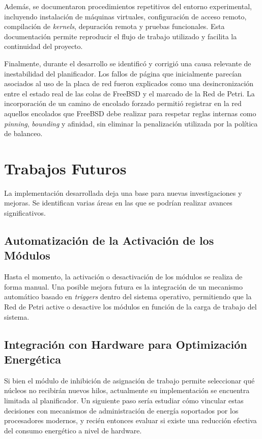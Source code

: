 Además, se documentaron procedimientos repetitivos del entorno experimental, incluyendo instalación de máquinas virtuales, configuración de acceso remoto, compilación de \textit{kernels}, depuración remota y pruebas funcionales. Esta documentación permite reproducir el flujo de trabajo utilizado y facilita la continuidad del proyecto.\par

Finalmente, durante el desarrollo se identificó y corrigió una causa relevante de inestabilidad del planificador. Los fallos de página que inicialmente parecían asociados al uso de la placa de red fueron explicados como una desincronización entre el estado real de las colas de FreeBSD y el marcado de la Red de Petri. La incorporación de un camino de encolado forzado permitió registrar en la red aquellos encolados que FreeBSD debe realizar para respetar reglas internas como \textit{pinning}, \textit{bounding} y afinidad, sin eliminar la penalización utilizada por la política de balanceo.\par

\section{Trabajos Futuros}

La implementación desarrollada deja una base para nuevas investigaciones y mejoras. Se identifican varias áreas en las que se podrían realizar avances significativos.\par

\subsection{Automatización de la Activación de los Módulos}
Hasta el momento, la activación o desactivación de los módulos se realiza de forma manual. Una posible mejora futura es la integración de un mecanismo automático basado en \textit{triggers} dentro del sistema operativo, permitiendo que la Red de Petri active o desactive los módulos en función de la carga de trabajo del sistema.\par

\subsection{Integración con Hardware para Optimización Energética}
Si bien el módulo de inhibición de asignación de trabajo permite seleccionar qué núcleos no recibirán nuevos hilos, actualmente su implementación se encuentra limitada al planificador. Un siguiente paso sería estudiar cómo vincular estas decisiones con mecanismos de administración de energía soportados por los procesadores modernos, y recién entonces evaluar si existe una reducción efectiva del consumo energético a nivel de hardware.\par

